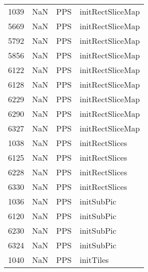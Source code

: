 \begin{tabular}{llll}
1039 &                   NaN &                        PPS &                          initRectSliceMap \\
5669 &                   NaN &                        PPS &                          initRectSliceMap \\
5792 &                   NaN &                        PPS &                          initRectSliceMap \\
5856 &                   NaN &                        PPS &                          initRectSliceMap \\
6122 &                   NaN &                        PPS &                          initRectSliceMap \\
6128 &                   NaN &                        PPS &                          initRectSliceMap \\
6229 &                   NaN &                        PPS &                          initRectSliceMap \\
6290 &                   NaN &                        PPS &                          initRectSliceMap \\
6327 &                   NaN &                        PPS &                          initRectSliceMap \\
1038 &                   NaN &                        PPS &                            initRectSlices \\
6125 &                   NaN &                        PPS &                            initRectSlices \\
6228 &                   NaN &                        PPS &                            initRectSlices \\
6330 &                   NaN &                        PPS &                            initRectSlices \\
1036 &                   NaN &                        PPS &                                initSubPic \\
6120 &                   NaN &                        PPS &                                initSubPic \\
6230 &                   NaN &                        PPS &                                initSubPic \\
6324 &                   NaN &                        PPS &                                initSubPic \\
1040 &                   NaN &                        PPS &                                 initTiles \\

\end{tabular}
